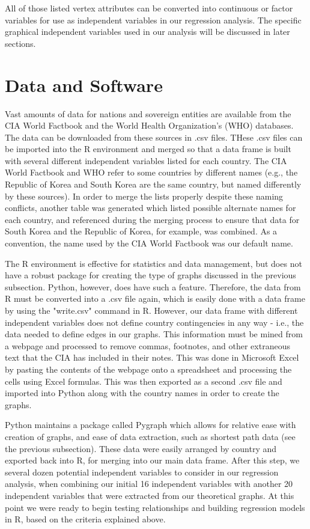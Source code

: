 \documentclass[oneside,12pt]{report}
\begin{document}
All of those listed vertex attributes can be converted into continuous or factor variables for use as independent variables in our regression analysis. The specific graphical independent variables used in our analysis will be discussed in later sections.

\section*{Data and Software}

Vast amounts of data for nations and sovereign entities are available from the CIA World Factbook and the World Health Organization's (WHO) databases. The data can be downloaded from these sources in .csv files. THese .csv files can be imported into the R environment and merged so that a data frame is built with several different independent variables listed for each country. The CIA World Factbook and WHO refer to some countries by different names (e.g., the Republic of Korea and South Korea are the same country, but named differently by these sources). In order to merge the lists properly despite these naming conflicts, another table was generated which listed possible alternate names for each country, and referenced during the merging process to ensure that data for South Korea and the Republic of Korea, for example, was combined. As a convention, the name used by the CIA World Factbook was our default name.

The R environment is effective for statistics and data management, but does not have a robust package for creating the type of graphs discussed in the previous subsection. Python, however, does have such a feature. Therefore, the data from R must be converted into a .csv file again, which is easily done with a data frame by using the "write.csv" command in R. However, our data frame with different independent variables does not define country contingencies in any way - i.e., the data needed to define edges in our graphs. This information must be mined from a webpage and processed to remove commas, footnotes, and other extraneous text that the CIA has included in their notes. This was done in Microsoft Excel by pasting the contents of the webpage onto a spreadsheet and processing the cells using Excel formulas. This was then exported as a second .csv file and imported into Python along with the country names in order to create the graphs.

Python maintains a package called Pygraph which allows for relative ease with creation of graphs, and ease of data extraction, such as shortest path data (see the previous subsection). These data were easily arranged by country and exported back into R, for merging into our main data frame. After this step, we several dozen potential independent variables to consider in our regression analysis, when combining our initial 16 independent variables with another 20 independent variables that were extracted from our theoretical graphs. At this point we were ready to begin testing relationships and building regression models in R, based on the criteria explained above.
\end{document}
